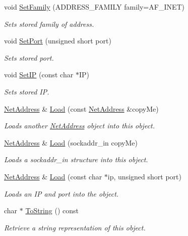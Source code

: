 \begin{DoxyCompactItemize}
void \hyperlink{class_net_address_a2fdc2546f2cf304c9be1f335bbf83697}{SetFamily} (ADDRESS\_\-FAMILY family=AF\_\-INET)
\begin{DoxyCompactList}\small\item\em Sets stored family of address. \item\end{DoxyCompactList}\item 
void \hyperlink{class_net_address_ab29bb77be2a0010aac0074092b600c1d}{SetPort} (unsigned short port)
\begin{DoxyCompactList}\small\item\em Sets stored port. \item\end{DoxyCompactList}\item 
void \hyperlink{class_net_address_a182fe874139fc4c7204aeb32df77bafb}{SetIP} (const char $\ast$IP)
\begin{DoxyCompactList}\small\item\em Sets stored IP. \item\end{DoxyCompactList}\item 
\hyperlink{class_net_address}{NetAddress} \& \hyperlink{class_net_address_a9035af4c168773f2a0d06f865038af9f}{Load} (const \hyperlink{class_net_address}{NetAddress} \&copyMe)
\begin{DoxyCompactList}\small\item\em Loads another \hyperlink{class_net_address}{NetAddress} object into this object. \item\end{DoxyCompactList}\item 
\hyperlink{class_net_address}{NetAddress} \& \hyperlink{class_net_address_a0262be45996adff068852a0a30f9abab}{Load} (sockaddr\_\-in copyMe)
\begin{DoxyCompactList}\small\item\em Loads a sockaddr\_\-in structure into this object. \item\end{DoxyCompactList}\item 
\hyperlink{class_net_address}{NetAddress} \& \hyperlink{class_net_address_ab2f1c7b1b892b621886ce82d5d920ab4}{Load} (const char $\ast$ip, unsigned short port)
\begin{DoxyCompactList}\small\item\em Loads an IP and port into the object. \item\end{DoxyCompactList}\item 
char $\ast$ \hyperlink{class_net_address_ad6975fe1ea49c0088f8d7c96dcf2e42d}{ToString} () const 
\begin{DoxyCompactList}\small\item\em Retrieve a string representation of this object. \item\end{DoxyCompactList}\end{DoxyCompactItemize}
